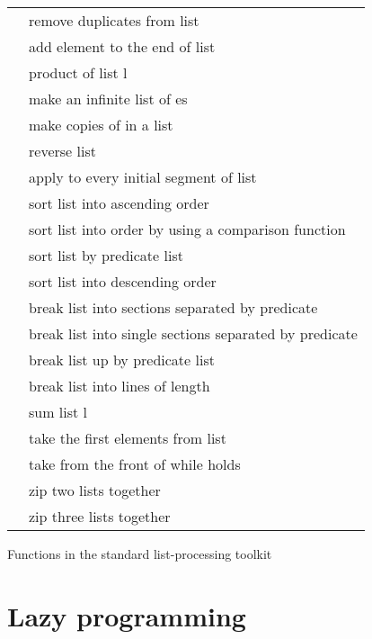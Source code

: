 \begin{tab2}
\begin{center}
\begin{tabular}{||l|l||}
\ct{mkset l} 		& remove duplicates from list \ct{l} \\
\ct{postfix l r} 	& add element \ct{r} to the end of list \ct{l} \\
\ct{product l} 		& product of list l \\
\ct{repeat x} 		& make an infinite list of \ct{x}es \\
\ct{replicate n x} 	& make \ct{n} copies of \ct{x} in a list \\
\ct{reverse l} 		& reverse list \ct{l} \\
\ct{scan fn st l} 	& apply \ct{(foldr fn r)} to every initial segment
			  of list \ct{l} \\
\ct{sort l} 		& sort list \ct{l} into ascending order \\
\ct{sortc fn l} 	& sort list \ct{l} into order by using a comparison
			  function \\
\ct{sortpl pl l} 	& sort list \ct{l} by predicate list \ct{pl} \\
\ct{sortr l} 		& sort list \ct{l} into descending order \\
\ct{split fn l} 	& break list \ct{l} into sections separated by
			  predicate \ct{fn} \\
\ct{splits fn l} 	& break list \ct{l} into single sections separated by
			  predicate \ct{fn} \\
\ct{splitpl pl l} 	& break list \ct{l} up by predicate list \ct{pl} \\
\ct{split\_lines n l} 	& break list \ct{l} into lines of length \ct{n} \\
\ct{sum l} 		& sum list l \\
\ct{take n l} 		& take the first \ct{n} elements from list \ct{l} \\
\ct{takewhile fn l} 	& take from the front of \ct{l} while \ct{fn} holds \\
\ct{zip2 l1 l2} 	& zip two lists together \\
\ct{zip3 l1 l2 l3} 	& zip three lists together \\
\hline
\end{tabular}
\end{center}
\caption{Functions in the standard list-processing toolkit}
\end{tab2}

\section{Lazy programming}

